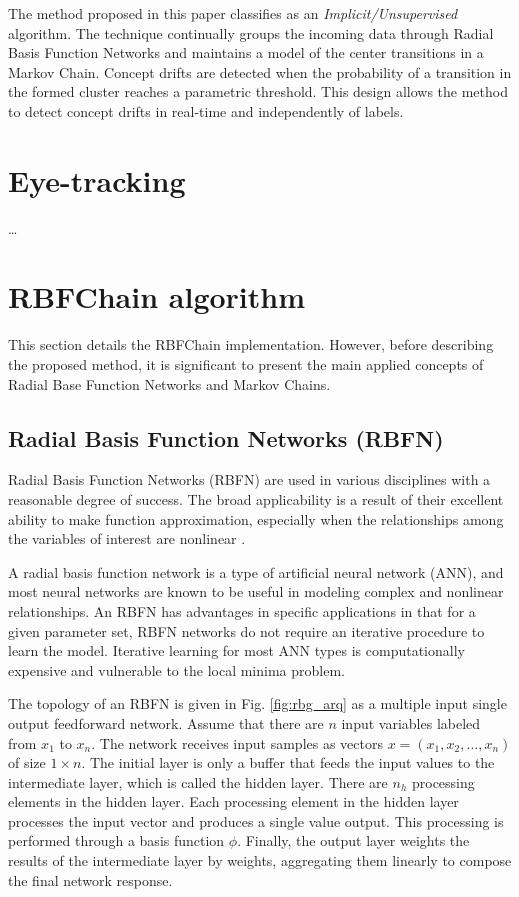 \documentclass[preprint,12pt]{elsarticle}
\begin{document}
The method proposed in this paper classifies as an \textit{Implicit/Unsupervised} algorithm.
The technique continually groups the incoming data through Radial Basis Function Networks and maintains a model of the center transitions in a Markov Chain.
Concept drifts are detected when the probability of a transition in the formed cluster reaches a parametric threshold.
This design allows the method to detect concept drifts in real-time and independently of labels.

\section{Eye-tracking}
\label{sec:eye_tracking}

\ldots

\section{RBFChain algorithm}
\label{sec:rbfchain_algorithm}

This section details the RBFChain implementation. However, before describing the proposed method, it is significant to present the main applied concepts of Radial Base Function Networks and Markov Chains.

\subsection{Radial Basis Function Networks (RBFN)}

Radial Basis Function Networks (RBFN) are used in various disciplines with a reasonable degree of success. The broad applicability is a result of their excellent ability to make function approximation, especially when the relationships among the variables of interest are nonlinear \cite{Bishop:2006:PRM:1162264}.

A radial basis function network is a type of artificial neural network (ANN), and most neural networks are known to be useful in modeling complex and nonlinear relationships. An RBFN has advantages in specific applications in that for a given parameter set, RBFN networks do not require an iterative procedure to learn the model. Iterative learning for most ANN types is computationally expensive and vulnerable to the local minima problem.

The topology of an RBFN is given in Fig. \ref{fig:rbg_arq} as a multiple input single output feedforward network.
Assume that there are $n$ input variables labeled from $x_1$ to $x_n$.
The network receives input samples as vectors $x=(x_1, x_2, \ldots, x_n)$ of size $1 \times n$.
The initial layer is only a buffer that feeds the input values to the intermediate layer, which is called the hidden layer.
There are $n_h$ processing elements in the hidden layer.
Each processing element in the hidden layer processes the input vector and produces a single value output. This processing is performed through a basis function $\phi$.
Finally, the output layer weights the results of the intermediate layer by weights, aggregating them linearly to compose the final network response.
\end{document}
